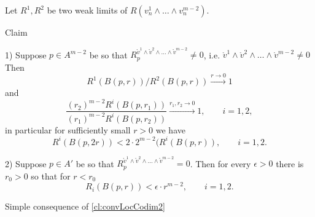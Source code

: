 Let $R^1, R^2$ be two weak limits
of  $R(v^1_n\wedge\dots\wedge v^{m-2}_n )$.

\begin{thm}{Claim}\label{cl:R12loc}


1) Suppose $p\in A^{m-2}$ be so that $R_p^{\mathring{v}^1\wedge \mathring{v}^2\wedge\dots\wedge \mathring{v}^{m-2}}\neq 0$, i.e.
$\mathring{v}^1\wedge \mathring{v}^2\wedge\dots\wedge \mathring{v}^{m-2}\neq 0$
Then
$$R^1(B(p,r))/R^2(B(p,r))\xrightarrow{r\to 0} 1$$
and
$$\frac{(r_2)^{m-2}R^i(B(p,r_1))}{(r_1)^{m-2}R^i(B(p,r_2))}\xrightarrow{r_1, r_2\to 0} 1, \qquad i=1, 2,$$
in particular for sufficiently small $r>0$
we have
$$ R^i(B(p,2r))<2\cdot 2^{m-2}(R^i(B(p,r)),\qquad i=1, 2.$$

2) Suppose $p\in A'$ be so that $R_p^{\mathring{v}^1\wedge \mathring{v}^2\wedge\dots\wedge \mathring{v}^{m-2}}= 0$.
Then for every $\epsilon>0$ there is $r_0>0$ so that
for $r<r_0$
$$ R_i(B(p,r))<\epsilon\cdot r^{m-2},\qquad i=1, 2.$$
\end{thm}

 Simple consequence of \ref{cl:convLocCodim2} \qeds
